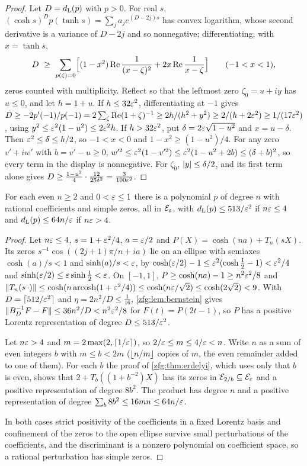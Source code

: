 \begin{proof}
Let $D=d_{\mathrm L}(p)$ with $p>0$. For real $s$, $(\cosh s)^Dp(\tanh s)=\sum_ja_je^{(D-2j)s}$ has convex logarithm, whose second derivative is a
variance of $D-2j$ and so nonnegative; differentiating, with $x=\tanh s$,
\[
 D\ \ge\ \sum_{p(\zeta)=0}\Bigl[(1-x^2)\Re\frac1{(x-\zeta)^2}+2x\Re\frac1{x-\zeta}\Bigr]\qquad(-1<x<1),
\]
zeros counted with multiplicity. Reflect so that the leftmost zero $\zeta_0=u+iy$ has $u\le0$, and let $h=1+u$. If $h\le32\varepsilon^2$,
differentiating at $-1$ gives $D\ge-2p'(-1)/p(-1)=2\sum_\zeta\operatorname{Re}(1+\zeta)^{-1}\ge2h/(h^2+y^2)\ge2/(h+2\varepsilon^2)\ge1/(17\varepsilon^2)$, using
$y^2\le\varepsilon^2(1-u^2)\le2\varepsilon^2h$. If $h>32\varepsilon^2$, put $\delta=2\varepsilon\sqrt{1-u^2}$ and $x=u-\delta$. Then $\varepsilon^2\le\delta\le h/2$, so $-1<x<0$ and
$1-x^2\ge(1-u^2)/4$. For any zero $v'+iw'$ with $b=v'-u\ge0$, $w'^2\le\varepsilon^2(1-v'^2)\le\varepsilon^2(1-u^2+2b)\le(\delta+b)^2$, so every term in the
display is nonnegative. For $\zeta_0$, $\lvert y\rvert\le\delta/2$, and its first term alone gives
$D\ge\tfrac{1-u^2}4\cdot\tfrac{12}{25\delta^2}=\tfrac3{100\varepsilon^2}$.
\end{proof}

\begin{theorem}\label{zfg:thm:ellipseup}
For each even $n\ge2$ and $0<\varepsilon\le1$ there is a polynomial $p$ of degree $n$ with rational coefficients and simple zeros, all in
$\mathcal E_\varepsilon$, with $d_{\mathrm L}(p)\le513/\varepsilon^2$ if $n\varepsilon\le4$ and $d_{\mathrm L}(p)\le64n/\varepsilon$ if $n\varepsilon>4$.
\end{theorem}

\begin{proof}
Let $n\varepsilon\le4$, $s=1+\varepsilon^2/4$, $a=\varepsilon/2$ and $P(X)=\cosh(na)+T_n(sX)$. Its zeros $s^{-1}\cos((2j+1)\pi/n+ia)$ lie on an ellipse with
semiaxes $\cosh(a)/s<1$ and $\sinh(a)/s<\varepsilon$, by $\cosh(\varepsilon/2)-1\le\varepsilon^2(\cosh\tfrac12-1)<\varepsilon^2/4$ and $\sinh(\varepsilon/2)\le\varepsilon\sinh\tfrac12<\varepsilon$. On
$[-1,1]$, $P\ge\cosh(na)-1\ge n^2\varepsilon^2/8$ and $\lVert T_n(s\,\cdot)\rVert\le\cosh(n\operatorname{arcosh}(1+\varepsilon^2/4))\le\cosh(n\varepsilon/\sqrt2)\le\cosh(2\sqrt2)<9$. With
$D=\lceil512/\varepsilon^2\rceil$ and $\eta=2n^2/D\le\tfrac1{16}$, \cref{zfg:lem:bernstein} gives
$\lVert B_D^{-1}F-F\rVert\le36n^2/D<n^2\varepsilon^2/8$ for $F(t)=P(2t-1)$, so $P$ has a positive Lorentz representation of degree
$D\le513/\varepsilon^2$.

Let $n\varepsilon>4$ and $m=2\max(2,\lceil1/\varepsilon\rceil)$, so $2/\varepsilon\le m\le4/\varepsilon<n$. Write $n$ as a sum of even integers $b$ with $m\le b<2m$
($\lfloor n/m\rfloor$ copies of $m$, the even remainder added to one of them). For each $b$ the proof of \cref{zfg:thm:erdelyi},
which uses only that $b$ is even, shows that $2+T_b((1+b^{-2})X)$ has its zeros in $\mathcal E_{2/b}\subseteq\mathcal E_\varepsilon$ and a positive
representation of degree $8b^2$. The product has degree $n$ and a positive representation of degree $\sum_b8b^2\le16mn\le64n/\varepsilon$.

In both cases strict positivity of the coefficients in a fixed Lorentz basis and confinement of the zeros to the open
ellipse survive small perturbations of the coefficients, and the discriminant is a nonzero polynomial on coefficient
space, so a rational perturbation has simple zeros.
\end{proof}

